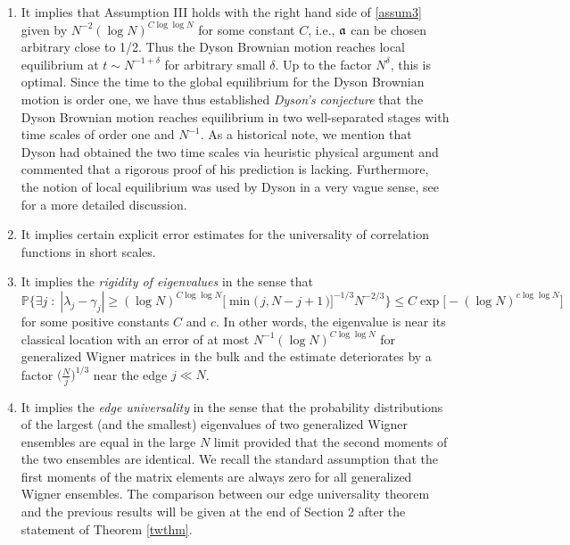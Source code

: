 \documentclass[draft]{article}
\newcommand{\fa}{{\frak a}}
\newcommand{\be}{\begin{equation}}
\newcommand{\ee}{\end{equation}}
\renewcommand{\P}{{\mathbb P}}
\numberwithin{equation}{section}
\numberwithin{theorem}{section}
\numberwithin{definition}{section}
\numberwithin{remark}{section}
\begin{document}
\begin{enumerate}
\item  It implies that  
Assumption III  holds with the right hand side of \eqref{assum3} given by
 $N^{-2} (\log N)^{C\log\log N}$ for some constant $C$,
i.e., $\fa$ can be chosen arbitrary close to 1/2. Thus  the Dyson 
Brownian motion reaches local equilibrium at 
 $t \sim N^{-1 + \delta}$ for arbitrary 
small $\delta$. Up to the factor $N^{\delta}$,  this  is optimal.  Since  the time to the global 
equilibrium for the Dyson Brownian motion is order one, we have thus
 established {\it Dyson's conjecture} 
 \cite{Dy} that 
the Dyson Brownian motion reaches equilibrium in two well-separated 
stages with time scales of order one and $N^{-1}$.
As a historical  note, we mention that  
Dyson had obtained the two time scales via heuristic  physical argument and commented that 
a rigorous proof of his prediction is lacking.  Furthermore, the notion of local equilibrium was used by Dyson in a very vague 
sense, see \cite{ESY4} for a more detailed discussion. 


\item  It  implies certain explicit error estimates 
for the universality of correlation functions in short scales. 

\item  It implies the {\it rigidity of eigenvalues}  in the sense that
\be\label{71.1}
\P \Bigg\{ \exists j\; : \; |\lambda_j-\gamma_j| 
\ge (\log N)^{C\log\log N}
 \Big [ \min \big ( \, j ,  N-j+1 \,  \big) \Big  ]^{-1/3}   N^{-2/3} \Bigg\}
 \le  C\exp{\big[-(\log N)^{c\log \log N} \big]}
\ee
for some positive constants $C$ and  $c$.
In other words, the eigenvalue is near its classical location 
with an error of at most $N^{-1} (\log N)^{C\log\log N}$
for generalized Wigner matrices in the bulk and the estimate deteriorates
 by a factor $ \big (\frac N {j} \big )^{1/3} $ near the edge  $j \ll N$.


 
 \item It implies the {\it edge universality} in the sense that the probability 
distributions of the largest (and the smallest)  eigenvalues of two generalized 
Wigner  ensembles are equal  in the large $N$ limit  provided that the second
 moments  of the two ensembles are identical. We recall the standard assumption
 that the first moments of the matrix elements are always  zero 
for all generalized Wigner ensembles. 
The comparison between our  edge universality  theorem and the previous results will be given 
at the end of Section 2 after the statement of Theorem \ref{twthm}.



\end{enumerate}
\end{document}
